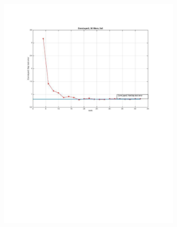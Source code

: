 \documentclass{article} %
\begin{document}
\begin{figure}[h]
  \centering
  \begin{subfigure}[b]{0.40\textwidth}
   \includegraphics[width=\textwidth]{images/imagesCNN_page1.pdf}
    \caption{}
  \end{subfigure}
  \begin{subfigure}[b]{0.40\textwidth}

\end{subfigure}
\end{figure}
\end{document}
